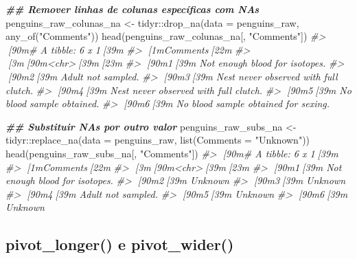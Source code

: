 \documentclass[
]{book}
\newenvironment{Shaded}{\begin{snugshade}}{\end{snugshade}}
\newcommand{\AttributeTok}[1]{\textcolor[rgb]{0.61,0.61,0.61}{#1}}
\newcommand{\CommentTok}[1]{\textcolor[rgb]{0.37,0.37,0.37}{\textit{#1}}}
\newcommand{\DocumentationTok}[1]{\textcolor[rgb]{0.37,0.37,0.37}{\textbf{\textit{#1}}}}
\newcommand{\FunctionTok}[1]{\textcolor[rgb]{0,0,0}{#1}}
\newcommand{\NormalTok}[1]{#1}
\newcommand{\OtherTok}[1]{\textcolor[rgb]{0.37,0.37,0.37}{#1}}
\newcommand{\SpecialCharTok}[1]{\textcolor[rgb]{0,0,0}{#1}}
\newcommand{\StringTok}[1]{\textcolor[rgb]{0.5,0.5,0.5}{#1}}
\begin{document}
\begin{Shaded}
\begin{Highlighting}[]
\DocumentationTok{\#\# Remover linhas de colunas específicas com NAs}
\NormalTok{penguins\_raw\_colunas\_na }\OtherTok{\textless{}{-}}\NormalTok{ tidyr}\SpecialCharTok{::}\FunctionTok{drop\_na}\NormalTok{(}\AttributeTok{data =}\NormalTok{ penguins\_raw,}
                                          \FunctionTok{any\_of}\NormalTok{(}\StringTok{"Comments"}\NormalTok{))}
\FunctionTok{head}\NormalTok{(penguins\_raw\_colunas\_na[, }\StringTok{"Comments"}\NormalTok{])}
\CommentTok{\#\textgreater{} [90m\# A tibble: 6 x 1[39m}
\CommentTok{\#\textgreater{}   [1mComments[22m                             }
\CommentTok{\#\textgreater{}   [3m[90m\textless{}chr\textgreater{}[39m[23m                                }
\CommentTok{\#\textgreater{} [90m1[39m Not enough blood for isotopes.       }
\CommentTok{\#\textgreater{} [90m2[39m Adult not sampled.                   }
\CommentTok{\#\textgreater{} [90m3[39m Nest never observed with full clutch.}
\CommentTok{\#\textgreater{} [90m4[39m Nest never observed with full clutch.}
\CommentTok{\#\textgreater{} [90m5[39m No blood sample obtained.            }
\CommentTok{\#\textgreater{} [90m6[39m No blood sample obtained for sexing.}

\DocumentationTok{\#\# Substituir NAs por outro valor}
\NormalTok{penguins\_raw\_subs\_na }\OtherTok{\textless{}{-}}\NormalTok{ tidyr}\SpecialCharTok{::}\FunctionTok{replace\_na}\NormalTok{(}\AttributeTok{data =}\NormalTok{ penguins\_raw,}
                                          \FunctionTok{list}\NormalTok{(}\AttributeTok{Comments =} \StringTok{"Unknown"}\NormalTok{))}
\FunctionTok{head}\NormalTok{(penguins\_raw\_subs\_na[, }\StringTok{"Comments"}\NormalTok{])}
\CommentTok{\#\textgreater{} [90m\# A tibble: 6 x 1[39m}
\CommentTok{\#\textgreater{}   [1mComments[22m                      }
\CommentTok{\#\textgreater{}   [3m[90m\textless{}chr\textgreater{}[39m[23m                         }
\CommentTok{\#\textgreater{} [90m1[39m Not enough blood for isotopes.}
\CommentTok{\#\textgreater{} [90m2[39m Unknown                       }
\CommentTok{\#\textgreater{} [90m3[39m Unknown                       }
\CommentTok{\#\textgreater{} [90m4[39m Adult not sampled.            }
\CommentTok{\#\textgreater{} [90m5[39m Unknown                       }
\CommentTok{\#\textgreater{} [90m6[39m Unknown}
\end{Highlighting}
\end{Shaded}

\hypertarget{pivot_longer-e-pivot_wider}{%
\subsection{pivot\_longer() e pivot\_wider()}\label{pivot_longer-e-pivot_wider}}
\end{document}
